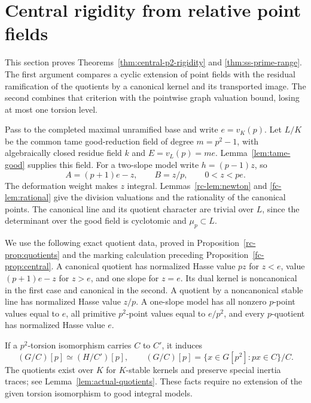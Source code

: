 \section{Central rigidity from relative point fields}\label{sec:central-ramification}
This section proves Theorems~\ref{thm:central-p2-rigidity} and \ref{thm:ss-prime-range}. The first argument compares a cyclic extension of point fields with the residual ramification of the quotients by a canonical kernel and its transported image. The second combines that criterion with the pointwise graph valuation bound, losing at most one torsion level.

Pass to the completed maximal unramified base and write $e=v_K(p)$. Let $L/K$ be the common tame good-reduction field of degree $m=p^2-1$, with algebraically closed residue field $k$ and $E=v_L(p)=me$. Lemma~\ref{lem:tame-good} supplies this field. For a two-slope model write $h=(p-1)z$, so
\begin{equation}\label{cr-eq:AB}
 A=(p+1)e-z,\qquad B=z/p,\qquad 0<z<pe.
\end{equation}
The deformation weight makes $z$ integral. Lemmas~\ref{rc-lem:newton} and \ref{fc-lem:rational} give the division valuations and the rationality of the canonical points. The canonical line and its quotient character are trivial over $L$, since the determinant over the good field is cyclotomic and $\mu_p\subset L$.

We use the following exact quotient data, proved in Proposition~\ref{rc-prop:quotients} and the marking calculation preceding Proposition~\ref{fc-prop:central}. A canonical quotient has normalized Hasse value $pz$ for $z<e$, value $(p+1)e-z$ for $z>e$, and one slope for $z=e$. Its dual kernel is noncanonical in the first case and canonical in the second. A quotient by a noncanonical stable line has normalized Hasse value $z/p$. A one-slope model has all nonzero $p$-point values equal to $e$, all primitive $p^2$-point values equal to $e/p^2$, and every $p$-quotient has normalized Hasse value $e$.

If a $p^2$-torsion isomorphism carries $C$ to $C'$, it induces
\begin{equation}\label{cr-eq:quotient}
 (G/C)[p]\simeq(H/C')[p],\qquad
 (G/C)[p]=\{x\in G[p^2]:px\in C\}/C.
\end{equation}
The quotients exist over $K$ for $K$-stable kernels and preserve special inertia traces; see Lemma~\ref{lem:actual-quotients}. These facts require no extension of the given torsion isomorphism to good integral models.

